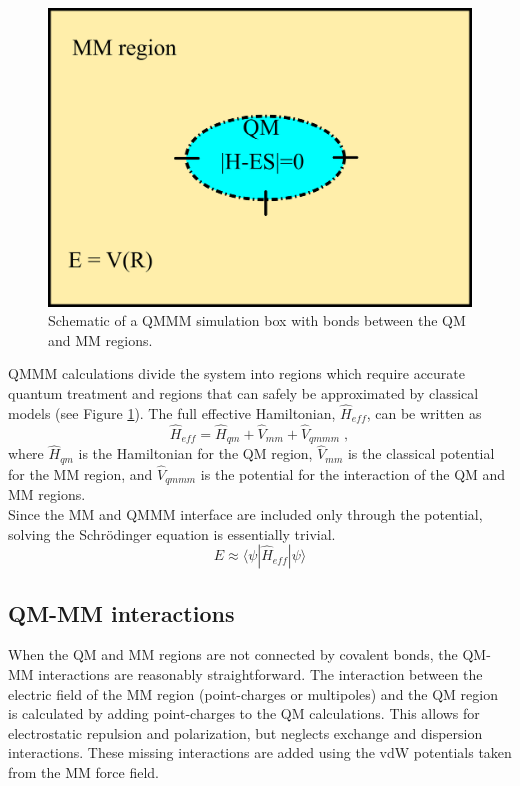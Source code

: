 \documentclass[12pt]{report}
\begin{document}
\begin{figure}[hbt]
 \centering
 \includegraphics[scale=0.50]{../doc/images/QMMM_1.png}
 \caption{
 Schematic of a QMMM simulation box with bonds between the QM and MM
 regions.}
 \label{fig:QMMM1}
\end{figure}

QMMM calculations divide the system into regions which require accurate
quantum treatment and regions that can safely be approximated by classical
models (see Figure \ref{fig:QMMM1}).
The full effective Hamiltonian,
$\hat H_{eff}$, can be written as
\begin{equation}
 \hat H_{eff} = \hat H_{qm} + \hat V_{mm} + \hat V_{qmmm} \; ,
\end{equation}
where $\hat H_{qm}$ is the Hamiltonian for the QM region, $\hat V_{mm}$
is the classical potential for the MM region, and $\hat V_{qmmm}$ is the
potential for the interaction of the QM and MM regions. \\

Since the MM and QMMM interface are included only through the potential,
solving the Schr\"odinger equation is essentially trivial.
\begin{equation}
 E \approx \langle \psi |\hat H_{eff}|\psi \rangle
\end{equation}

\subsection{QM-MM interactions}

When the QM and MM regions are not connected by covalent bonds, the QM-MM
interactions are reasonably straightforward.
The interaction between the electric field of the MM region (point-charges or
multipoles) and the QM region is calculated by adding point-charges to the QM
calculations.
This allows for electrostatic repulsion and polarization, but neglects
exchange and dispersion interactions.
These missing interactions are added using the vdW potentials taken from the
MM force field. \\
\end{document}
